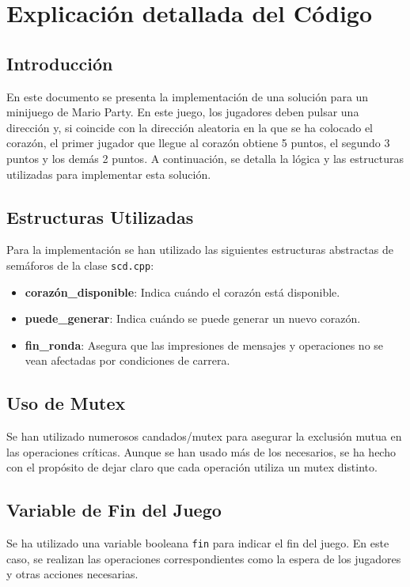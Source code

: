 \documentclass[a4paper,12pt]{article}
\begin{document}
\section{Explicación detallada del Código}

\subsection{Introducción}
En este documento se presenta la implementación de una solución para un minijuego de Mario Party. En este juego, los jugadores deben pulsar una dirección y, si coincide con la dirección aleatoria en la que se ha colocado el corazón, el primer jugador que llegue al corazón obtiene 5 puntos, el segundo 3 puntos y los demás 2 puntos. A continuación, se detalla la lógica y las estructuras utilizadas para implementar esta solución.

\subsection{Estructuras Utilizadas}
Para la implementación se han utilizado las siguientes estructuras abstractas de semáforos de la clase \texttt{scd.cpp}:
\begin{itemize}
    \item \textbf{corazón\_disponible}: Indica cuándo el corazón está disponible.
    \item \textbf{puede\_generar}: Indica cuándo se puede generar un nuevo corazón.
    \item \textbf{fin\_ronda}: Asegura que las impresiones de mensajes y operaciones no se vean afectadas por condiciones de carrera.
\end{itemize}

\subsection{Uso de Mutex}
Se han utilizado numerosos candados/mutex para asegurar la exclusión mutua en las operaciones críticas. Aunque se han usado más de los necesarios, se ha hecho con el propósito de dejar claro que cada operación utiliza un mutex distinto.

\subsection{Variable de Fin del Juego}
Se ha utilizado una variable booleana \texttt{fin} para indicar el fin del juego. En este caso, se realizan las operaciones correspondientes como la espera de los jugadores y otras acciones necesarias.
\end{document}
